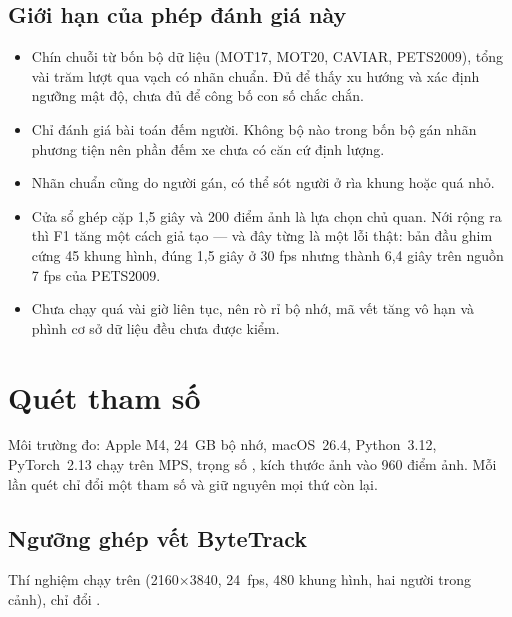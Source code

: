 \subsection{Giới hạn của phép đánh giá này}

\begin{itemize}[leftmargin=*, itemsep=2pt]
  \item Chín chuỗi từ bốn bộ dữ liệu (MOT17, MOT20, CAVIAR, PETS2009), tổng vài trăm
        lượt qua vạch có nhãn chuẩn. Đủ để thấy xu hướng và xác định ngưỡng mật độ,
        chưa đủ để công bố con số chắc chắn.
  \item Chỉ đánh giá bài toán đếm người. Không bộ nào trong bốn bộ gán nhãn phương
        tiện nên phần đếm xe chưa có căn cứ định lượng.
  \item Nhãn chuẩn cũng do người gán, có thể sót người ở rìa khung hoặc quá nhỏ.
  \item Cửa sổ ghép cặp 1{,}5 giây và 200 điểm ảnh là lựa chọn chủ quan. Nới rộng ra
        thì F1 tăng một cách giả tạo --- và đây từng là một lỗi thật: bản đầu ghim cứng
        45 khung hình, đúng 1{,}5 giây ở 30 fps nhưng thành 6{,}4 giây trên nguồn 7 fps
        của PETS2009.
  \item Chưa chạy quá vài giờ liên tục, nên rò rỉ bộ nhớ, mã vết tăng vô hạn và phình
        cơ sở dữ liệu đều chưa được kiểm.
\end{itemize}

\section{Quét tham số}
\label{sec:quettham}

Môi trường đo: Apple M4, 24~GB bộ nhớ, macOS~26.4, Python~3.12, PyTorch~2.13
chạy trên MPS, trọng số , kích thước ảnh vào 960 điểm ảnh. Mỗi lần
quét chỉ đổi một tham số và giữ nguyên mọi thứ còn lại.

\subsection{Ngưỡng ghép vết ByteTrack}

Thí nghiệm chạy trên  (2160$\times$3840, 24~fps, 480 khung
hình, hai người trong cảnh), chỉ đổi .

